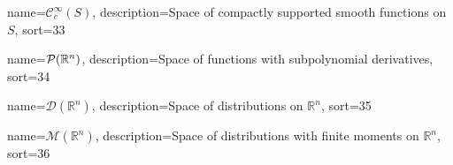 {
  name={\ensuremath{\mathcal{C}_c^\infty(S)}},
  description={Space of compactly supported smooth functions on $S$},
  sort=33
}


{
  name={\ensuremath{\mathcal{P}(\R^n)}},
  description={Space of functions with subpolynomial derivatives},
  sort=34
}


{
  name={\ensuremath{\mathcal{D}(\mathbb{R}^n)}},
  description={Space of distributions on $\mathbb{R}^n$},
  sort=35
}


{
  name={\ensuremath{\mathcal{M}(\mathbb{R}^n)}},
  description={Space of distributions with finite moments on $\mathbb{R}^n$},
  sort=36
}


